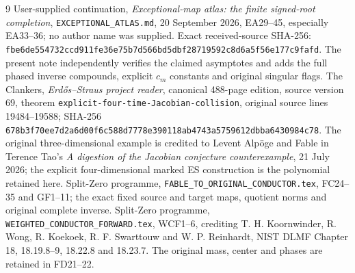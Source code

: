 \documentclass[11pt]{article}
\begin{document}
\begin{thebibliography}{9}
 User-supplied continuation,
\emph{Exceptional-map atlas: the finite signed-root completion},
\texttt{EXCEPTIONAL\_ATLAS.md}, 20 September 2026,
EA29--45, especially EA33--36; no author name was supplied.
Exact received-source SHA-256:
\texttt{fbe6de554732ccd911fe36e75b7d566bd5dbf28719592c8d6a5f56e177c9fafd}.
The present note independently verifies the claimed asymptotes
and adds the full phased inverse compounds, explicit \(c_m\)
constants and original singular flags.
 The Clankers, \emph{Erd\H{o}s--Straus project reader},
canonical 488-page edition, source version 69, theorem
\texttt{explicit-four-time-Jacobian-collision}, original
source lines 19484--19588; SHA-256
\texttt{678b3f70ee7d2a6d00f6c588d7778e390118ab4743a5759612dbba6430984c78}.
The original three-dimensional example is credited to
Levent Alp\"oge and Fable in Terence Tao's
\emph{A digestion of the Jacobian conjecture counterexample},
21 July 2026; the explicit four-dimensional marked ES
construction is the polynomial retained here.
 Split-Zero programme,
\texttt{FABLE\_TO\_ORIGINAL\_CONDUCTOR.tex},
FC24--35 and GF1--11; the exact fixed source and target
maps, quotient norms and original complete inverse.
 Split-Zero programme,
\texttt{WEIGHTED\_CONDUCTOR\_FORWARD.tex}, WCF1--6,
crediting T. H. Koornwinder, R. Wong, R. Koekoek,
R. F. Swarttouw and W. P. Reinhardt, NIST DLMF
Chapter 18, 18.19.8--9, 18.22.8 and 18.23.7.
The original mass, center and phases are retained in FD21--22.
\end{thebibliography}
\end{document}
